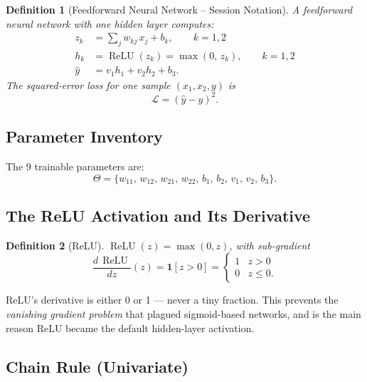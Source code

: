 \documentclass[12pt,a4paper]{article}
\newtheorem{definition}{Definition}[section]
\newcommand{\Loss}{\mathcal{L}}
\newcommand{\ReLU}{\operatorname{ReLU}}
\newcommand{\yhat}{\hat{y}}
\begin{document}
\begin{definition}[Feedforward Neural Network -- Session Notation]
\label{def:ffnn}
A \emph{feedforward neural network} with one hidden layer computes:
\begin{align}
  z_k &= \sum_j w_{kj}\,x_j + b_k, \qquad k=1,2 \label{eq:hidden-preact}\\
  h_k &= \ReLU(z_k) = \max(0,\, z_k), \qquad k=1,2 \label{eq:relu}\\
  \yhat &= v_1 h_1 + v_2 h_2 + b_3. \label{eq:output}
\end{align}
The squared-error loss for one sample $(x_1,x_2,y)$ is
\begin{equation}
  \Loss = (\yhat - y)^2. \label{eq:loss}
\end{equation}
\end{definition}

\subsection{Parameter Inventory}

The 9 trainable parameters are:
\[
  \Theta = \{w_{11},\, w_{12},\, w_{21},\, w_{22},\, b_1,\, b_2,\, v_1,\, v_2,\, b_3\}.
\]

\subsection{The ReLU Activation and Its Derivative}

\begin{definition}[ReLU]
\label{def:relu}
$\ReLU(z) = \max(0,z)$, with sub-gradient
\begin{equation}
  \frac{d\,\ReLU}{dz}(z) = \mathbf{1}[z > 0] =
  \begin{cases} 1 & z > 0 \\ 0 & z \leq 0. \end{cases}
  \label{eq:relu-deriv}
\end{equation}
\end{definition}

\begin{keyinsight}
ReLU's derivative is either 0 or 1 --- never a tiny fraction.
This prevents the \emph{vanishing gradient problem} that plagued
sigmoid-based networks, and is the main reason ReLU became the
default hidden-layer activation.
\end{keyinsight}

\subsection{Chain Rule (Univariate)}
\end{document}
